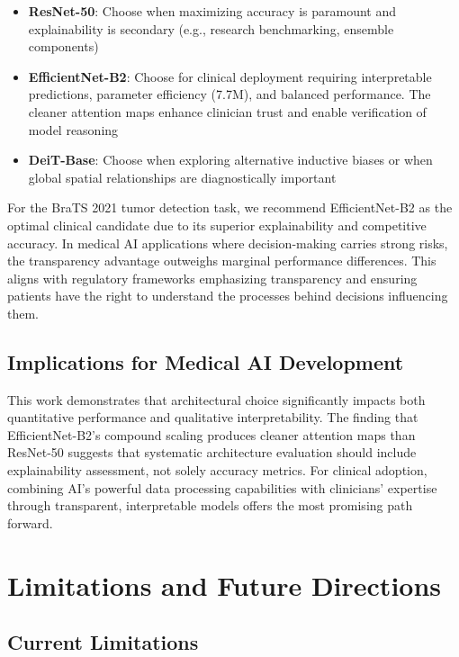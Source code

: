 \begin{itemize}
    \item \textbf{ResNet-50}: Choose when maximizing accuracy is paramount and explainability is secondary (e.g., research benchmarking, ensemble components)
    \item \textbf{EfficientNet-B2}: Choose for clinical deployment requiring interpretable predictions, parameter efficiency (7.7M), and balanced performance. The cleaner attention maps enhance clinician trust and enable verification of model reasoning
    \item \textbf{DeiT-Base}: Choose when exploring alternative inductive biases or when global spatial relationships are diagnostically important
\end{itemize}

For the BraTS 2021 tumor detection task, we recommend EfficientNet-B2 as the optimal clinical candidate due to its superior explainability and competitive accuracy. In medical AI applications where decision-making carries strong risks, the transparency advantage outweighs marginal performance differences. This aligns with regulatory frameworks emphasizing transparency and ensuring patients have the right to understand the processes behind decisions influencing them.

\subsection{Implications for Medical AI Development}

This work demonstrates that architectural choice significantly impacts both quantitative performance and qualitative interpretability. The finding that EfficientNet-B2's compound scaling produces cleaner attention maps than ResNet-50 suggests that systematic architecture evaluation should include explainability assessment, not solely accuracy metrics. For clinical adoption, combining AI's powerful data processing capabilities with clinicians' expertise through transparent, interpretable models offers the most promising path forward.

\section{Limitations and Future Directions}

\subsection{Current Limitations}

